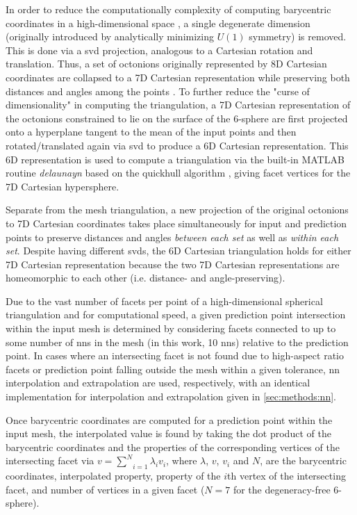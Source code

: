 \documentclass[preprint,12pt]{elsarticle}
\begin{document}
In order to reduce the computationally complexity of computing barycentric coordinates in a high-dimensional space \cite{barberQuickhullAlgorithmConvex1996}, a single degenerate dimension (originally introduced by analytically minimizing $U(1)$ symmetry) is removed. This is done via a \gls{svd} projection, analogous to a Cartesian rotation and translation. Thus, a set of octonions originally represented by 8D Cartesian coordinates are collapsed to a 7D Cartesian representation while preserving both distances and angles among the points \cite{}. To further reduce the "curse of dimensionality" in computing the triangulation, a 7D Cartesian representation of the octonions constrained to lie on the surface of the 6-sphere are first projected onto a hyperplane tangent to the mean of the input points and then rotated/translated again via \gls{svd} to produce a 6D Cartesian representation. This 6D representation is used to compute a triangulation via the built-in MATLAB routine \textit{delaunayn} based on the quickhull algorithm \cite{barberQuickhullAlgorithmConvex1996}, giving facet vertices for the 7D Cartesian hypersphere.

Separate from the mesh triangulation, a new projection of the original octonions to 7D Cartesian coordinates takes place simultaneously for input and prediction points to preserve distances and angles \textit{between each set} as well as \textit{within each set}. Despite having different \glspl{svd}, the 6D Cartesian triangulation holds for either 7D Cartesian representation because the two 7D Cartesian representations are homeomorphic to each other (i.e. distance- and angle-preserving).

Due to the vast number of facets per point of a high-dimensional spherical triangulation and for computational speed, a given prediction point intersection within the input mesh is determined by considering facets connected to up to some number of \glspl{nn} in the mesh (in this work, 10 \glspl{nn}) relative to the prediction point. In cases where an intersecting facet is not found due to high-aspect ratio facets or prediction point falling outside the mesh within a given tolerance, \gls{nn} interpolation and extrapolation are used, respectively, with an identical implementation for interpolation and extrapolation given in \ref{sec:methods:nn}.

Once barycentric coordinates are computed for a prediction point within the input mesh, the interpolated value is found by taking the dot product of the barycentric coordinates and the properties of the corresponding vertices of the intersecting facet via $v=\underset{i=1}{\overset{N}{\sum }}\lambda _i v_i$, where $\lambda$, $v$, $v_i$ and $N$, are the barycentric coordinates, interpolated property, property of the $i$th vertex of the intersecting facet, and number of vertices in a given facet ($N = 7$ for the degeneracy-free 6-sphere).
    
\end{document}
